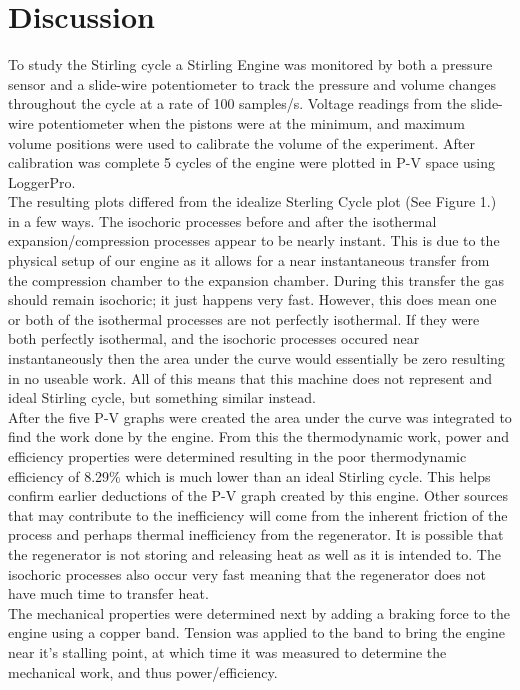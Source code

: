 \documentclass{article}
\begin{document}
\section{Discussion}
To study the Stirling cycle a Stirling Engine was monitored by both a pressure sensor and a slide-wire potentiometer to track the pressure and volume changes throughout the cycle at a rate of 100 samples/s. Voltage readings from the slide-wire potentiometer when the pistons were at the minimum, and maximum volume positions were used to calibrate the volume of the experiment. After calibration was complete 5 cycles of the engine were plotted in P-V space using LoggerPro.\\
The resulting plots differed from the idealize Sterling Cycle plot (See Figure 1.) in a few ways. The isochoric processes before and after the isothermal expansion/compression processes appear to be nearly instant. This is due to the physical setup of our engine as it allows for a near instantaneous transfer from the compression chamber to the expansion chamber. During this transfer the gas should remain isochoric; it just happens very fast. However, this does mean one or both of the isothermal processes are not perfectly isothermal. If they were both perfectly isothermal, and the isochoric processes occured near instantaneously then the area under the curve would essentially be zero resulting in no useable work. All of this means that this machine does not represent and ideal Stirling cycle, but something similar instead.\\
After the five P-V graphs were created the area under the curve was integrated to find the work done by the engine. From this the thermodynamic work, power and efficiency properties were determined resulting in the poor thermodynamic efficiency of 8.29\% which is much lower than an ideal Stirling cycle. This helps confirm earlier deductions of the P-V graph created by this engine. Other sources that may contribute to the inefficiency will come from the inherent friction of the process and perhaps thermal inefficiency from the regenerator. It is possible that the regenerator is not storing and releasing heat as well as it is intended to. The isochoric processes also occur very fast meaning that the regenerator does not have much time to transfer heat.\\
The mechanical properties were determined next by adding a braking force to the engine using a copper band. Tension was applied to the band to bring the engine near it's stalling point, at which time it was measured to determine the mechanical work, and thus power/efficiency.\\
\end{document}
